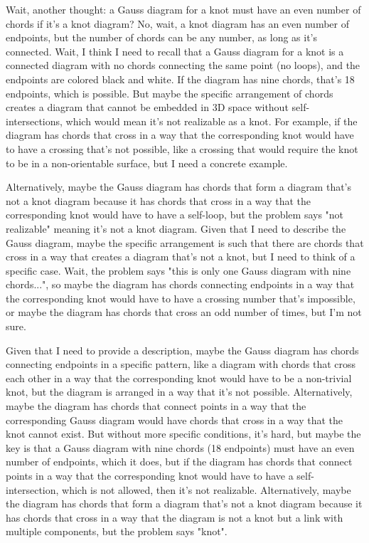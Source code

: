 Wait, another thought: a Gauss diagram for a knot must have an even number of chords if it's a knot diagram? No, wait, a knot diagram has an even number of endpoints, but the number of chords can be any number, as long as it's connected. Wait, I think I need to recall that a Gauss diagram for a knot is a connected diagram with no chords connecting the same point (no loops), and the endpoints are colored black and white. If the diagram has nine chords, that's 18 endpoints, which is possible. But maybe the specific arrangement of chords creates a diagram that cannot be embedded in 3D space without self-intersections, which would mean it's not realizable as a knot. For example, if the diagram has chords that cross in a way that the corresponding knot would have to have a crossing that's not possible, like a crossing that would require the knot to be in a non-orientable surface, but I need a concrete example.

Alternatively, maybe the Gauss diagram has chords that form a diagram that's not a knot diagram because it has chords that cross in a way that the corresponding knot would have to have a self-loop, but the problem says "not realizable" meaning it's not a knot diagram. Given that I need to describe the Gauss diagram, maybe the specific arrangement is such that there are chords that cross in a way that creates a diagram that's not a knot, but I need to think of a specific case. Wait, the problem says "this is only one Gauss diagram with nine chords...", so maybe the diagram has chords connecting endpoints in a way that the corresponding knot would have to have a crossing number that's impossible, or maybe the diagram has chords that cross an odd number of times, but I'm not sure.

Given that I need to provide a description, maybe the Gauss diagram has chords connecting endpoints in a specific pattern, like a diagram with chords that cross each other in a way that the corresponding knot would have to be a non-trivial knot, but the diagram is arranged in a way that it's not possible. Alternatively, maybe the diagram has chords that connect points in a way that the corresponding Gauss diagram would have chords that cross in a way that the knot cannot exist. But without more specific conditions, it's hard, but maybe the key is that a Gauss diagram with nine chords (18 endpoints) must have an even number of endpoints, which it does, but if the diagram has chords that connect points in a way that the corresponding knot would have to have a self-intersection, which is not allowed, then it's not realizable. Alternatively, maybe the diagram has chords that form a diagram that's not a knot diagram because it has chords that cross in a way that the diagram is not a knot but a link with multiple components, but the problem says "knot".

